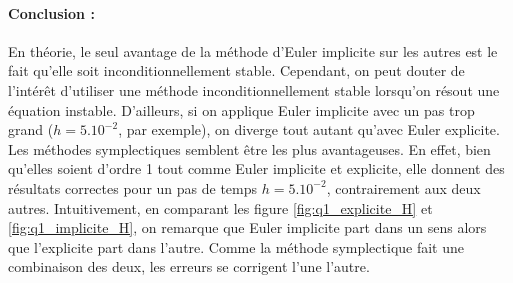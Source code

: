 \paragraph{Conclusion : } En théorie, le seul avantage de la méthode d'Euler implicite sur les autres est le fait qu'elle soit inconditionnellement stable. Cependant, on peut douter de l'intérêt d'utiliser une méthode inconditionnellement stable lorsqu'on résout une équation instable. D'ailleurs, si on applique Euler implicite avec un pas trop grand ($h=5.10^{-2}$, par exemple), on diverge tout autant qu'avec Euler explicite. \\
  Les méthodes symplectiques semblent être les plus avantageuses. En effet, bien qu'elles soient d'ordre 1 tout comme Euler implicite et explicite, elle donnent des résultats correctes pour un pas de temps $h=5.10^{-2}$, contrairement aux deux autres. Intuitivement, en comparant les figure \ref{fig:q1_explicite_H} et \ref{fig:q1_implicite_H}, on remarque que Euler implicite part dans un sens alors que l'explicite part dans l'autre. Comme la méthode symplectique fait une combinaison des deux, les erreurs se corrigent l'une l'autre.







